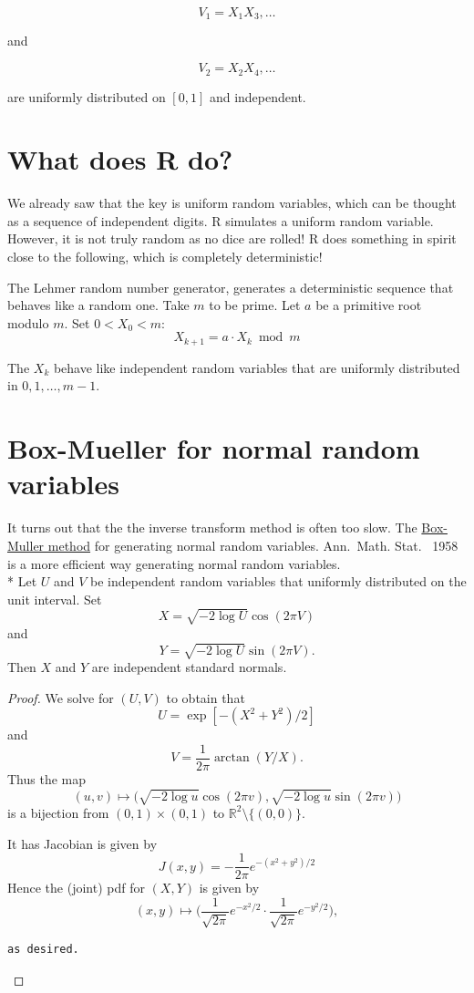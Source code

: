 \documentclass[
]{article}
\theoremstyle{definition}
\theoremstyle{definition}
\theoremstyle{definition}
\theoremstyle{remark}
\begin{document}
\[V_1 = X_1 X_3, \ldots\]

and

\[V_2 = X_2 X_4, \ldots\]

are uniformly distributed on \([0,1]\) and independent.

\hypertarget{what-does-r-do}{%
\section{What does R do?}\label{what-does-r-do}}

We already saw that the key is uniform random variables, which can be thought as a sequence of independent digits. R simulates a uniform random variable. However, it is not truly random as no dice are rolled! R does something in spirit close to the following, which is completely deterministic!

The Lehmer random number generator, generates a deterministic sequence that behaves like a random one. Take \(m\) to be prime. Let \(a\) be a primitive root modulo \(m\). Set \(0 < X_0 < m\):\\
\[X_{k+1} = a \cdot X_k \bmod m\]

The \(X_k\) behave like independent random variables that are uniformly distributed in \(0, 1, \ldots, m-1\).

\hypertarget{box-mueller-for-normal-random-variables}{%
\section{Box-Mueller for normal random variables}\label{box-mueller-for-normal-random-variables}}

It turns out that the the inverse transform method is often too slow. The \href{https://projecteuclid.org/journals/annals-of-mathematical-statistics/volume-29/issue-2/A-Note-on-the-Generation-of-Random-Normal-Deviates/10.1214/aoms/1177706645.full}{Box-Muller method} for generating normal random variables. Ann.~Math. Stat.~ 1958 is a more efficient way generating normal random variables.\\
* Let \(U\) and \(V\) be independent random variables that uniformly distributed on the unit interval. Set
\[X = \sqrt{ -2 \log U} \cos (2 \pi V)\]
and
\[Y =     \sqrt{ -2 \log U} \sin (2 \pi V).\]
Then \(X\) and \(Y\) are independent standard normals.

\begin{proof}
{}We solve for \((U,V)\) to obtain that
\[U = \exp[  -(X^2 + Y^2)/2]\]
and
\[V =  \frac{1}{2\pi} \arctan(Y /X).\]
Thus the map \[(u, v) \mapsto  \big (\sqrt{ -2 \log u} \cos (2 \pi v),  \sqrt{ -2 \log u} \sin (2 \pi v)  \big)\]
is a bijection from \((0,1) \times (0,1)\) to \(\mathbb{R}^2 \setminus \{ (0,0)\}.\)

It has Jacobian is given by
\[J(x,y) = -\frac{1}{2\pi } e^{-(x^2 + y^2)/2}\]
Hence the (joint) pdf for \((X,Y)\) is given by
\[(x,y) \mapsto  \Big( \frac{1}{\sqrt{2 \pi} } e^{-x^2/2}  \cdot    \frac{1}{\sqrt{2 \pi}}  e^{-y^2/2} \Big),\]

\begin{verbatim}
as desired.
\end{verbatim}
\end{proof}
\end{document}
